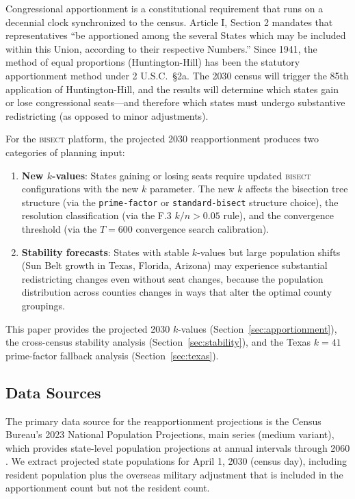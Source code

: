 \label{sec:introduction}

Congressional apportionment is a constitutional requirement that runs on a decennial
clock synchronized to the census. Article I, Section 2 mandates that representatives
``be apportioned among the several States which may be included within this Union,
according to their respective Numbers.'' Since 1941, the method of equal proportions
(Huntington-Hill) has been the statutory apportionment method under 2 U.S.C.\ \S 2a.
The 2030 census will trigger the 85th application of Huntington-Hill, and the results
will determine which states gain or lose congressional seats---and therefore which states
must undergo substantive redistricting (as opposed to minor adjustments).

For the \textsc{bisect} platform, the projected 2030 reapportionment produces two
categories of planning input:

\begin{enumerate}
\item \textbf{New $k$-values}: States gaining or losing seats require updated
  \textsc{bisect} configurations with the new $k$ parameter. The new $k$ affects
  the bisection tree structure (via the \texttt{prime-factor} or \texttt{standard-bisect}
  structure choice), the resolution classification (via the F.3 $k/n > 0.05$ rule),
  and the convergence threshold (via the $T=600$ convergence search calibration).

\item \textbf{Stability forecasts}: States with stable $k$-values but large population
  shifts (Sun Belt growth in Texas, Florida, Arizona) may experience substantial
  redistricting changes even without seat changes, because the population distribution
  across counties changes in ways that alter the optimal county groupings.
\end{enumerate}

This paper provides the projected 2030 $k$-values (Section~\ref{sec:apportionment}),
the cross-census stability analysis (Section~\ref{sec:stability}), and the Texas
$k=41$ prime-factor fallback analysis (Section~\ref{sec:texas}).

\subsection{Data Sources}

The primary data source for the reapportionment projections is the Census Bureau's
2023 National Population Projections, main series (medium variant), which provides
state-level population projections at annual intervals through 2060 \citep{censusProjections2023}.
We extract projected state populations for April 1, 2030 (census day), including
resident population plus the overseas military adjustment that is included in the
apportionment count but not the resident count.


